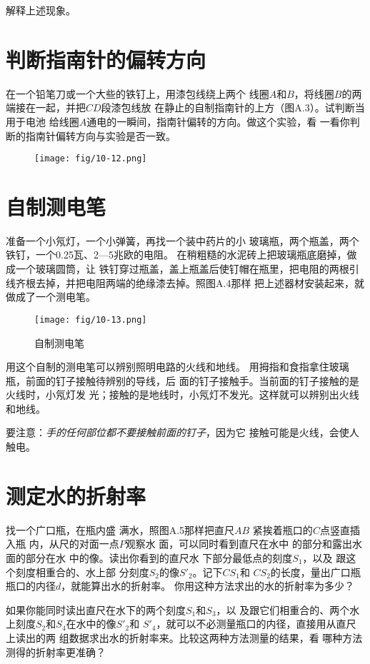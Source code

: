 解释上述现象。

\section{判断指南针的偏转方向}
在一个铅笔刀或一个大些的铁钉上，用漆包线绕上两个
线圈$A$和$B$，将线圈$B$的两端接在一起，并把$CD$段漆包线放
在静止的自制指南针的上方（图A.3）。试判断当用于电池
给线圈$A$通电的一瞬间，指南针偏转的方向。做这个实验，看
一看你判断的指南针偏转方向与实验是否一致。
\begin{figure}[htp]\centering
    \texttt{[image: fig/10-12.png]}
    \caption{}
    \end{figure}

\section{自制测电笔}
准备一个小氖灯，一个小弹簧，再找一个装中药片的小
玻璃瓶，两个瓶盖，两个铁钉，一个0.25瓦、2—5兆欧的电阻。
在稍粗糙的水泥砖上把玻璃瓶底磨掉，做成一个玻璃圆筒，让
铁钉穿过瓶盖，盖上瓶盖后使钉帽在瓶里，把电阻的两根引
线齐根去掉，并把电阻两端的绝缘漆去掉。照图A.4那样
把上述器材安装起来，就做成了一个测电笔。
\begin{figure}[htp]\centering
    \texttt{[image: fig/10-13.png]}
    \caption{自制测电笔}
    \end{figure}

用这个自制的测电笔可以辨别照明电路的火线和地线。
用拇指和食指拿住玻璃瓶，前面的钉子接触待辨别的导线，后
面的钉子接触手。当前面的钉子接触的是火线时，小氖灯发
光；接触的是地线时，小氖灯不发光。这样就可以辨别出火线
和地线。

要注意：\textit{手的任何部位都不要接触前面的钉子}，因为它
接触可能是火线，会使人触电。

\section{测定水的折射率}
找一个广口瓶，在瓶内盛
满水，照图A.5那样把直尺$AB$
紧挨着瓶口的$C$点竖直插入瓶
内，从尺的对面一点$P$观察水
面，可以同时看到直尺在水中
的部分和露出水面的部分在水
中的像。读出你看到的直尺水
下部分最低点的刻度$S_1$，以及
跟这个刻度相重合的、水上部
分刻度$S_2$的像$S'_2$。记下$CS_1$和
$CS_2$的长度，量出广口瓶瓶口的内径$d$，就能算出水的折射率。
你用这种方法求出的水的折射率为多少？
 
如果你能同时读出直尺在水下的两个刻度$S_1$和$S_3$，以
及跟它们相重合的、两个水上刻度$S_2$和$S_4$在水中的像$S'_2$和
$S'_4$，就可以不必测量瓶口的内径，直接用从直尺上读出的两
组数据求出水的折射率来。比较这两种方法测量的结果，看
哪种方法测得的折射率更准确？

